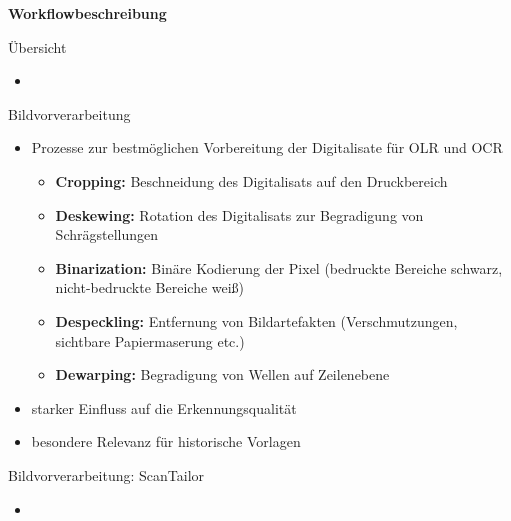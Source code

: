 \documentclass{bbawslides}
\begin{document}
\begin{bbawpart}{\Large\bf Workflowbeschreibung}
\end{bbawpart}

\begin{bbawslide}{Übersicht}
  \vspace*{7mm}%
  \centerslidestrue%
  \begin{itemize}
    \item
  \end{itemize}
\end{bbawslide}

\begin{bbawslide}{Bildvorverarbeitung}
  \vspace*{7mm}%
  \centerslidestrue%
  \begin{itemize}
    \item Prozesse zur bestmöglichen Vorbereitung der Digitalisate für OLR und OCR
    \begin{itemize}\small
      \item \textbf{Cropping:} Beschneidung des Digitalisats auf den Druckbereich
      \item \textbf{Deskewing:} Rotation des Digitalisats zur Begradigung von Schrägstellungen
      \item \textbf{Binarization:} Binäre Kodierung der Pixel (bedruckte Bereiche schwarz, nicht-bedruckte Bereiche weiß)
      \item \textbf{Despeckling:} Entfernung von Bildartefakten (Verschmutzungen, sichtbare Papiermaserung etc.)
      \item \textbf{Dewarping:} Begradigung von Wellen auf Zeilenebene
    \end{itemize}
    \item starker Einfluss auf die Erkennungsqualität
    \item besondere Relevanz für historische Vorlagen
  \end{itemize}
\end{bbawslide}

\begin{bbawslide}{Bildvorverarbeitung: ScanTailor}
  \vspace*{7mm}%
  \centerslidestrue%
  \begin{itemize}
    \item
  \end{itemize}
\end{bbawslide}
\end{document}
